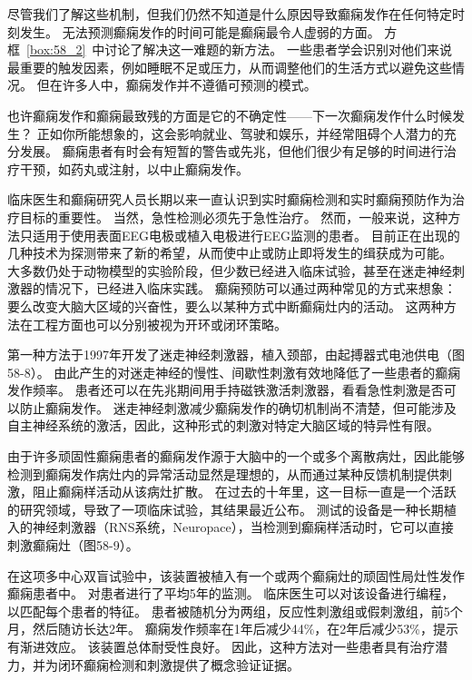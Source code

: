 尽管我们了解这些机制，但我们仍然不知道是什么原因导致癫痫发作在任何特定时刻发生。
无法预测癫痫发作的时间可能是癫痫最令人虚弱的方面。
方框~\ref{box:58_2}~中讨论了解决这一难题的新方法。
一些患者学会识别对他们来说最重要的触发因素，例如睡眠不足或压力，从而调整他们的生活方式以避免这些情况。
但在许多人中，癫痫发作并不遵循可预测的模式。


\begin{proposition}[实时检测和预防癫痫的新方法] \label{box:58_2}
	
	\quad \quad 也许癫痫发作和癫痫最致残的方面是它的不确定性——下一次癫痫发作什么时候发生？
	正如你所能想象的，这会影响就业、驾驶和娱乐，并经常阻碍个人潜力的充分发展。
	癫痫患者有时会有短暂的警告或先兆，但他们很少有足够的时间进行治疗干预，如药丸或注射，以中止癫痫发作。
	
	\quad \quad 临床医生和癫痫研究人员长期以来一直认识到实时癫痫检测和实时癫痫预防作为治疗目标的重要性。
	当然，急性检测必须先于急性治疗。
	然而，一般来说，这种方法只适用于使用表面EEG电极或植入电极进行EEG监测的患者。
	目前正在出现的几种技术为探测带来了新的希望，从而使中止或防止即将发生的缉获成为可能。
	大多数仍处于动物模型的实验阶段，但少数已经进入临床试验，甚至在迷走神经刺激器的情况下，已经进入临床实践。
	癫痫预防可以通过两种常见的方式来想象：要么改变大脑大区域的兴奋性，要么以某种方式中断癫痫灶内的活动。
	这两种方法在工程方面也可以分别被视为开环或闭环策略。
	
	\quad \quad 第一种方法于1997年开发了迷走神经刺激器，植入颈部，由起搏器式电池供电（图58-8）。
	由此产生的对迷走神经的慢性、间歇性刺激有效地降低了一些患者的癫痫发作频率。
	患者还可以在先兆期间用手持磁铁激活刺激器，看看急性刺激是否可以防止癫痫发作。
	迷走神经刺激减少癫痫发作的确切机制尚不清楚，但可能涉及自主神经系统的激活，因此，这种形式的刺激对特定大脑区域的特异性有限。
	
	\quad \quad 由于许多顽固性癫痫患者的癫痫发作源于大脑中的一个或多个离散病灶，因此能够检测到癫痫发作病灶内的异常活动显然是理想的，从而通过某种反馈机制提供刺激，阻止癫痫样活动从该病灶扩散。
	在过去的十年里，这一目标一直是一个活跃的研究领域，导致了一项临床试验，其结果最近公布。
	测试的设备是一种长期植入的神经刺激器（RNS系统，Neuropace），当检测到癫痫样活动时，它可以直接刺激癫痫灶（图58-9）。
	
	\quad \quad 在这项多中心双盲试验中，该装置被植入有一个或两个癫痫灶的顽固性局灶性发作癫痫患者中。
	对患者进行了平均5年的监测。
	临床医生可以对该设备进行编程，以匹配每个患者的特征。
	患者被随机分为两组，反应性刺激组或假刺激组，前5个月，然后随访长达2年。
	癫痫发作频率在1年后减少44\%，在2年后减少53\%，提示有渐进效应。
	该装置总体耐受性良好。
	因此，这种方法对一些患者具有治疗潜力，并为闭环癫痫检测和刺激提供了概念验证证据。
	

\end{proposition}
